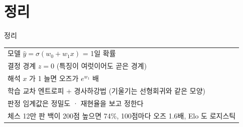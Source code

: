 \documentclass[aspectratio=169,11pt,t]{beamer}
\begin{document}
\section{정리}
\begin{frame}{정리}
\vfill
\centering\large\begin{tabular}{l}
모델 \quad $\hat y = \sigma(w_0 + w_1 x)$ = 1일 확률\\[0.5em]
결정 경계 \quad $z = 0$ (특징이 여럿이어도 곧은 경계)\\[0.5em]
해석 \quad $x$ 가 1 늘면 오즈가 $e^{w_1}$ 배\\[0.5em]
학습 \quad 교차 엔트로피 + 경사하강법 (기울기는 선형회귀와 같은 모양)\\[0.5em]
판정 \quad 임계값은 정밀도 · 재현율을 보고 정한다\\[0.5em]
체스 12만 판 \quad 백이 200점 높으면 74\%, 100점마다 오즈 1.6배, Elo 도 로지스틱
\end{tabular}
\vfill
{}
\end{frame}
\end{document}
